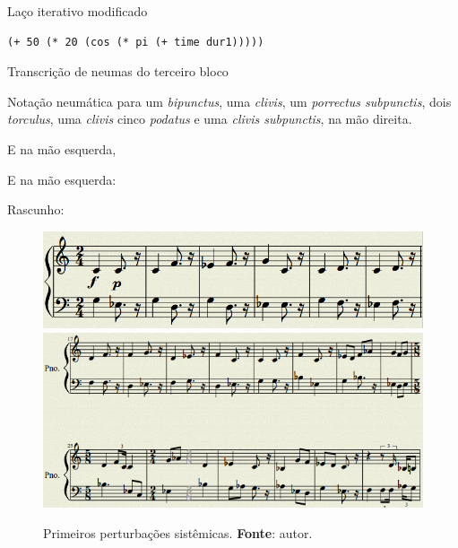 \begin{example}{Laço iterativo modificado}
\begin{verbatim}
(+ 50 (* 20 (cos (* pi (+ time dur1)))))
\end{verbatim}
\end{example}

\begin{example}{Transcrição de neumas do terceiro bloco}\label{fig:neumaMD3}

  Notação neumática para um \emph{bipunctus}, uma \emph{clivis}, um \emph{porrectus subpunctis}, dois \emph{torculus}, uma \emph{clivis}  cinco \emph{podatus} e uma \emph{clivis subpunctis}, na mão direita.

  \centering{}

  E na mão esquerda, 

  \centering{}
\end{example}

E na mão esquerda:


Rascunho:

\begin{figure}[!h]
  \centering
  \includegraphics[scale=0.5]{imagens/SIK_motivo.png}
  \includegraphics[scale=0.5]{imagens/SIK_perturba.png}
  \caption{Primeiros perturbações sistêmicas. \textbf{Fonte}: autor.}
  \label{fig:SIKinicio}
\end{figure}